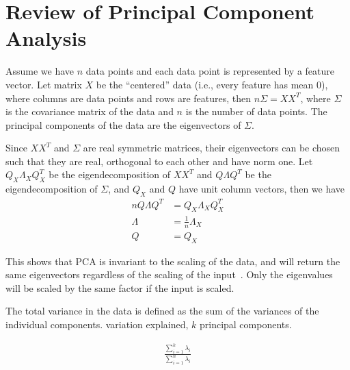 \chapter{Review of Principal Component Analysis}\label{app-pca}
Assume we have $n$ data points and each data point is represented by a feature
vector. Let matrix $X$ be the ``centered'' data (i.e., every feature has mean
0), where columns are data points and rows are features, then $n\Sigma = XX^T$,
where $\Sigma$ is the covariance matrix of the data and $n$ is the number of
data points. The principal components of the data are the eigenvectors of
$\Sigma$.

Since $XX^T$ and $\Sigma$ are real symmetric matrices, their eigenvectors can be
chosen such that they are real, orthogonal to each other and have norm one. Let
$Q_X\Lambda_X Q_X^T$ be the  eigendecomposition of $XX^T$ and $Q\Lambda Q^T$ be
the eigendecomposition of $\Sigma$, and $Q_X$ and $Q$ have unit column
vectors, then we have
\begin{align*}
nQ\Lambda Q^T &= Q_X\Lambda_X Q_X^T  \\
\Lambda &= \frac{1}{n}\Lambda_X \\
Q &= Q_X
\end{align*}

This shows that PCA is invariant to the scaling of the data, and will return the
same eigenvectors regardless of the scaling of the input~\cite{pca14}. Only the
eigenvalues will be scaled by the same factor if the input is scaled. 

The total variance in the data is defined as the sum of the variances
of the individual components. variation explained, $k$ principal components.

\begin{align}
\frac{\sum_{i=1}^{k} \lambda_i}{\sum_{i=1}^{n}\lambda_i}
\end{align}
